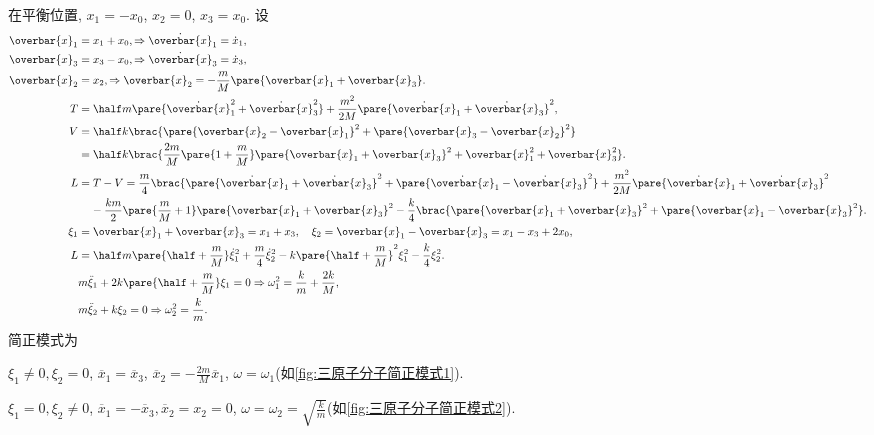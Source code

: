 \documentclass{ctexart}
\begin{document}
\begin{sample}
\begin{ex}[三原子分子振动]
        在平衡位置, $x_1 = -x_0$, $x_2=  0$, $x_3 = x_0$. 设
        \begin{align*}
            \overbar{x}_1 &= x_1 + x_0, \Rightarrow \dot{\overbar{x}}_1 = \dot{x}_1, \\
            \overbar{x}_3 &= x_3 - x_0, \Rightarrow \dot{\overbar{x}}_3 = \dot{x}_3, \\
            \overbar{x}_2 &= x_2, \Rightarrow \overbar{x}_2 = -\frac{m}{M}\pare{\overbar{x}_1 + \overbar{x}_3}. \\
            T&= \half m \pare{\dot{\overbar{x}}_1^2 + \dot{\overbar{x}}_3^2} + \frac{m^2}{2M}\pare{\dot{\overbar{x}}_1 + \dot{\overbar{x}}_3}^2, \\
            V&= \half k \brac{\pare{\overbar{x}_2 - \overbar{x}_1}^2 + \pare{\overbar{x}_3 - \overbar{x}_2}^2} \\
            &= \half k \brac{\frac{2m}{M}\pare{1+\frac{m}{M}} \pare{\overbar{x}_1 + \overbar{x}_3}^2 + \overbar{x}_1^2 + \overbar{x}_3^2}. \\
            L &= T-V = \frac{m}{4} \brac{\pare{\dot{\overbar{x}}_1 + \dot{\overbar{x}}_3}^2 + \pare{\dot{\overbar{x}}_1 - \dot{\overbar{x}}_3}^2} + \frac{m^2}{2M}\pare{\dot{\overbar{x}}_1 + \dot{\overbar{x}}_3}^2 \\
            &\phantom{=}\ -\frac{km}{2}\pare{\frac{m}{M}+1}\pare{\overbar{x}_1 + \overbar{x}_3}^2 - \frac{k}{4}\brac{\pare{\overbar{x}_1 + \overbar{x}_3}^2 + \pare{\overbar{x}_1 - \overbar{x}_3}^2}. \\
            \xi_1 &= \overbar{x}_1 + \overbar{x}_3 = x_1 + x_3,\quad \xi_2 = \overbar{x}_1 - \overbar{x}_3 = x_1 - x_3 + 2x_0, \\
            L &= \half m\pare{\half + \frac{m}{M}}\dot{\xi}_1^2 + \frac{m}{4} \dot{\xi}_2^2 - k\pare{\half + \frac{m}{M}}^2 \xi_1^2 - \frac{k}{4}\xi_2^2. \\
            & m\ddot{\xi}_1 + 2k\pare{\half + \frac{m}{M}} \xi_1 = 0\Rightarrow \omega_1^2 = \frac{k}{m} + \frac{2k}{M}, \\
            & m\ddot{\xi}_2 + k\xi_2 = 0 \Rightarrow \omega_2^2 = \frac{k}{m}.
        \end{align*}
        简正模式为
        \begin{cenum}
            \item $\xi_1 \neq 0, \xi_2 = 0$, $\overbar{x}_1 = \overbar{x}_3$, $\displaystyle \overbar{x}_2 = -\frac{2m}{M}\overbar{x}_1$, $\omega = \omega_1$(如\cref{fig:三原子分子简正模式1}).
            \item $\xi_1 = 0, \xi_2\neq 0$, $\overbar{x}_1 = -\overbar{x}_3, \overbar{x}_2 = x_2 = 0$, $\displaystyle \omega = \omega_2 = \sqrt{\frac{k}{m}}$(如\cref{fig:三原子分子简正模式2}).
        \end{cenum}
    \end{ex}
\end{sample}
\end{document}
